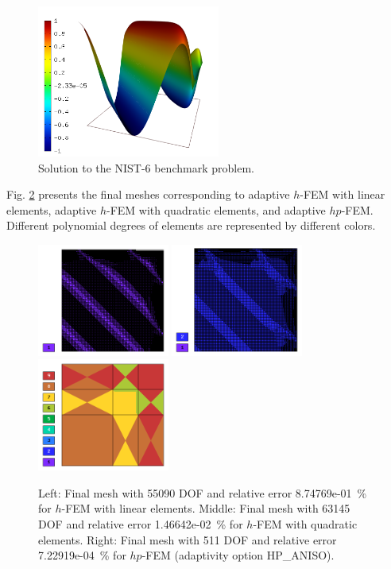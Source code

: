\documentclass[12pt]{elsarticle}
\begin{document}
\begin{figure}[H]
\centering
\vspace{-3mm}
\includegraphics[height=5cm]{nist/nist-6/solution.png}
\caption{Solution to the NIST-6 benchmark problem.}
\vspace{-3mm}
\label{fig:sln-nist06}
\end{figure}

Fig. \ref{fig:nist-6-hp-aniso} presents the final meshes corresponding to adaptive $h$-FEM with
linear elements, adaptive $h$-FEM with quadratic elements, and adaptive $hp$-FEM. Different
polynomial degrees of elements are represented by different colors.

\begin{figure}[H]
\centering
\includegraphics[height=3.7cm]{nist/nist-6/mesh_h1_aniso.png}
\includegraphics[height=3.7cm]{nist/nist-6/mesh_h2_aniso.png}
\includegraphics[height=3.7cm]{nist/nist-6/mesh_hp_aniso.png}
\vspace{-3mm}
\caption{
Left: Final mesh with 55090 DOF and relative error 8.74769e-01~\% for $h$-FEM with linear elements.
Middle: Final mesh with 63145 DOF and relative error 1.46642e-02~\% for $h$-FEM with quadratic elements.
Right: Final mesh with 511 DOF and relative error 7.22919e-04~\% for $hp$-FEM (adaptivity option HP\_ANISO).}
\vspace{-2mm}
\label{fig:nist-6-hp-aniso}
\end{figure}
\end{document}
